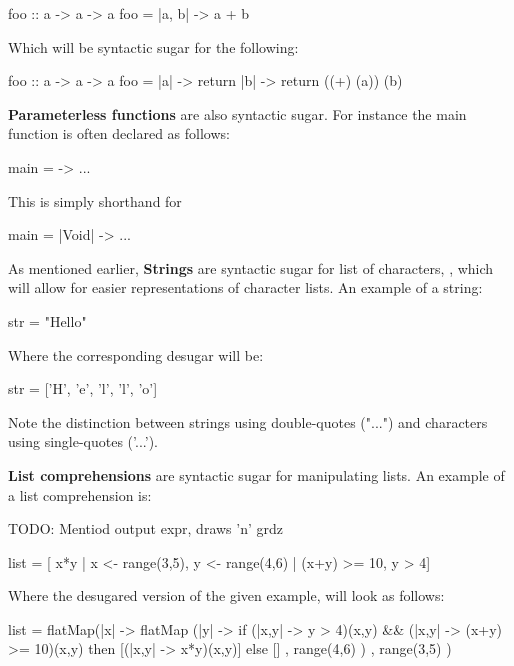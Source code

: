 \begin{kite}
foo :: a -> a -> a
foo = |a, b| -> {
  a + b
}
\end{kite}

Which will be syntactic sugar for the following:

\begin{kite}
foo :: a -> a -> a
foo = |a| -> {
  return |b| -> {
    return ((+) (a)) (b)
  }
}
\end{kite}

\textbf{Parameterless functions} are also syntactic sugar. For instance the main function is often declared as follows:

\begin{kite}
main = -> {
  ...
}
\end{kite}

This is simply shorthand for

\begin{kite}
main = |Void| -> {
  ...
}
\end{kite}

As mentioned earlier, \textbf{Strings} are syntactic sugar for list of characters, \code{[Char]}, which will allow for easier representations of character lists. An example of a string:

\begin{kite}
str = "Hello"
\end{kite}

Where the corresponding desugar will be:
\begin{kite}
str = ['H', 'e', 'l', 'l', 'o']
\end{kite}
Note the distinction between strings using double-quotes ("...") and characters using single-quotes ('...').

\label{sec:ex-listcomp}
\textbf{List comprehensions} are syntactic sugar for manipulating lists. An example of a list comprehension is:

TODO: Mentiod output expr, draws 'n' grdz

\begin{kite}
list = [ x*y | x <- range(3,5), y <- range(4,6) | (x+y) >= 10, y > 4]
\end{kite}

Where the desugared version of the given example, will look as follows:

\begin{kite}
list =
flatMap(|x| -> {
  flatMap (|y| -> {
    if (|x,y| -> {y > 4})(x,y) && (|x,y| -> {(x+y) >= 10})(x,y)
       then [(|x,y| -> {x*y})(x,y)]
       else []
  } , range(4,6) )
}, range(3,5) )
\end{kite}

